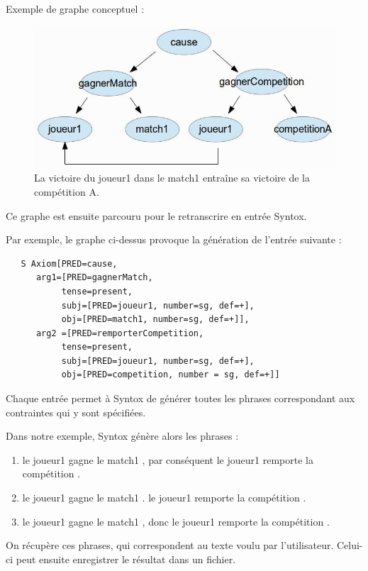 \documentclass[12pt]{report}
\begin{document}
Exemple de graphe conceptuel :
\begin{figure}[!h]
\begin{center}
	\includegraphics[scale=0.5]{graphe_cause.png}
	\caption{La victoire du joueur1 dans le match1 entraîne sa victoire de la compétition A.}
\end{center}
\end{figure}

Ce graphe est ensuite parcouru pour le retranscrire en entrée Syntox.

Par exemple, le graphe ci-dessus provoque la génération de l'entrée suivante :
\begin{verbatim}
   S Axiom[PRED=cause,
      arg1=[PRED=gagnerMatch, 
           tense=present, 
           subj=[PRED=joueur1, number=sg, def=+],
           obj=[PRED=match1, number=sg, def=+]],
      arg2 =[PRED=remporterCompetition,
           tense=present,
           subj=[PRED=joueur1, number=sg, def=+],
           obj=[PRED=competition, number = sg, def=+]]
\end{verbatim}

Chaque entrée permet à Syntox de générer toutes les phrases correspondant aux contraintes qui y sont spécifiées.

Dans notre exemple, Syntox génère alors les phrases :

\begin{enumerate}
    \item le joueur1 gagne le match1 , par conséquent le joueur1
remporte la compétition .
	\item le joueur1 gagne le match1 . le joueur1 remporte la
compétition .
	\item le joueur1 gagne le match1 , donc le joueur1 remporte
la compétition .

\end{enumerate}

On récupère ces phrases, qui correspondent au texte voulu par l'utilisateur. 
Celui-ci peut ensuite enregistrer le résultat dans un fichier.
\end{document}
